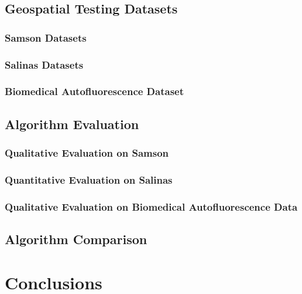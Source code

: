 \documentclass[10pt]{article}
\begin{document}
\clearpage
\subsection{Geospatial Testing Datasets}
\subsubsection{Samson Datasets}
\subsubsection{Salinas Datasets}
\subsubsection{Biomedical Autofluorescence Dataset}

\clearpage
\subsection{Algorithm Evaluation}
\subsubsection{Qualitative Evaluation on Samson}
\subsubsection{Quantitative Evaluation on Salinas}
\subsubsection{Qualitative Evaluation on Biomedical Autofluorescence Data}

\clearpage
\subsection{Algorithm Comparison}

\clearpage
% 
% 
% 
% 
% 

\clearpage
% 
% 
% 
% 
% 
\section{Conclusions}
\end{document}
